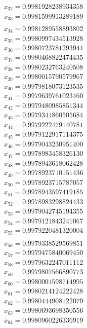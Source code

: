 \begin{multicols}{3}
\begin{align*}
		x_{32} = 0.9981928238934358\\
		x_{33} = 0.9981599913289189\\
	\end{align*}
	\vfill
	\columnbreak
	\begin{align*}
		x_{34} = 0.9981289558893802\\
		x_{35} = 0.9980997434513928\\
		x_{36} = 0.9980723781293944\\
		x_{37} = 0.9980468822474435\\
		x_{38} = 0.9980232763240508\\
		x_{39} = 0.9980015790579967\\
		x_{40} = 0.9979818073123535\\
		x_{41} = 0.9979639761023460\\
		x_{42} = 0.9979480985851344\\
		x_{43} = 0.9979341860505684\\
		x_{44} = 0.9979222479140781\\
		x_{45} = 0.9979122917114375\\
		x_{46} = 0.9979043230951400\\
		x_{47} = 0.9978983458326130\\
		x_{48} = 0.9978943618062428\\
		x_{49} = 0.9978923710151436\\
		x_{50} = 0.9978923715787057\\
		x_{51} = 0.9978943597419185\\
		x_{52} = 0.9978983298824433\\
		x_{53} = 0.9979042745194355\\
		x_{54} = 0.9979121843241067\\
		x_{55} = 0.9979220481320004\\
	\end{align*}
	\vfill
	\columnbreak
	\begin{align*}
		x_{56} = 0.9979338529569851\\
		x_{57} = 0.9979475840069450\\
		x_{58} = 0.9979632247011112\\
		x_{59} = 0.9979807566890773\\
		x_{60} = 0.9980001598714995\\
		x_{61} = 0.9980214124222428\\
		x_{62} = 0.9980444908122079\\
		x_{63} = 0.9980693698350556\\
		x_{64} = 0.9980960226336919\\

\end{align*}
\end{multicols}
